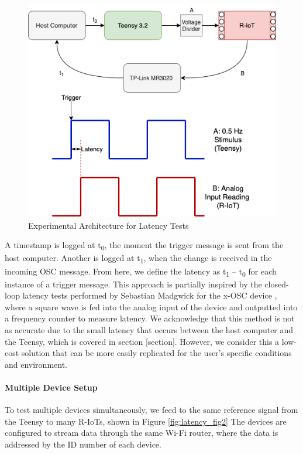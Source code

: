\begin{figure}[ht]
  \centering
    \includegraphics[width=\textwidth]{Chapters/Figures/technical/Latency/figure1.png}
    \caption{Experimental Architecture for Latency Tests}
    \label{fig:latency_fig1}
\end{figure}

A timestamp is logged at t\textsubscript{0}, the moment the trigger message is sent from the host computer. Another is logged at t\textsubscript{1}, when the change is received in the incoming OSC message. From here, we define the latency as t\textsubscript{1} – t\textsubscript{0} for each instance of a trigger message. This approach is partially inspired by the closed-loop latency tests performed by Sebastian Madgwick for the x-OSC device \cite{Madgwick}, where a square wave is fed into the analog input of the device and outputted into a frequency counter to measure latency. We acknowledge that this method is not as accurate due to the small latency that occurs between the host computer and the Teensy, which is covered in section [section]. However, we consider this a low-cost solution that can be more easily replicated for the user’s specific conditions and environment.

\paragraph{Multiple Device Setup}
To test multiple devices simultaneously, we feed to the same reference signal from the Teensy to many R-IoTs, shown in Figure \ref{fig:latency_fig2} The devices are configured to stream data through the same Wi-Fi router, where the data is addressed by the ID number of each device.

